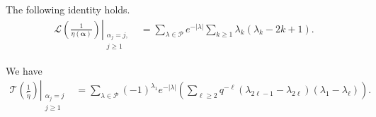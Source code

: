 \documentclass[10pt,a4paper]{amsart}
\begin{document}
\begin{lemma} \label{altlemma1} The following identity holds. 
\begin{align*}   \left. \mathcal{L} \left(\frac1{\eta({\pmb{\alpha}})}\right) \right\vert_{\substack{\alpha_j=j, \\ j\geq 1}}
& = \sum_{\lambda\in \mathcal{P}} e^{-\vert\lambda\vert}\sum_{k\geq1} \lambda_k(\lambda_k-2k+1).
\end{align*}
\end{lemma}

\begin{lemma} \label{altlemma4}  We have
\begin{align*}   
\left. \mathcal{T} \left(\frac1{\widetilde{\eta}}\right) \right\vert_{\substack{\alpha_j=j \\ j\geq1}}
& = \sum_{\lambda\in \mathcal{P}} (-1)^{\lambda_1} e^{-\vert\lambda\vert} 
 \left( \sum_{\ell\geq2} q^{-\ell} (\lambda_{2\ell-1}-\lambda_{2\ell})(\lambda_1-\lambda_{\ell}) \right).
\end{align*}
\end{lemma}
\end{document}

